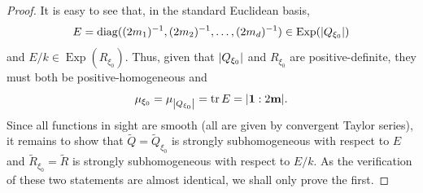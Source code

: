 \documentclass[11pt]{article}
\theoremstyle{remark}
\newcommand\Exp{\operatorname{Exp}}
\newcommand\diag{\operatorname{diag}}
\begin{document}
\begin{proof}
It is easy to see that, in the standard Euclidean basis, 
\begin{equation*}
    E = \diag((2m_1)^{-1}, (2m_2)^{-1},\dots, (2m_d)^{-1}) \in \Exp(\abs{Q_{\xi_0}})
\end{equation*}
and $E/k\in \Exp(R_{\xi_0})$. Thus, given that $\abs{Q_{\xi_0}}$ and $R_{\xi_0}$ are positive-definite, they must both be positive-homogeneous and
\begin{equation*}
    \mu_{\xi_0}=\mu_{\abs{Q_{\xi_0}}}=\tr E=|\mathbf{1}:2\mathbf{m}|.
\end{equation*}
Since all functions in sight are smooth (all are given by convergent Taylor series), it remains to show that $\widetilde{Q}=\widetilde{Q}_{\xi_0}$ is strongly subhomogeneous with respect to $E$ and $\widetilde{R}_{\xi_0}=\widetilde{R}$ is strongly subhomogeneous with respect to $E/k$. As the verification of these two statements are almost identical, we shall only prove the first.


\end{proof}
\end{document}
